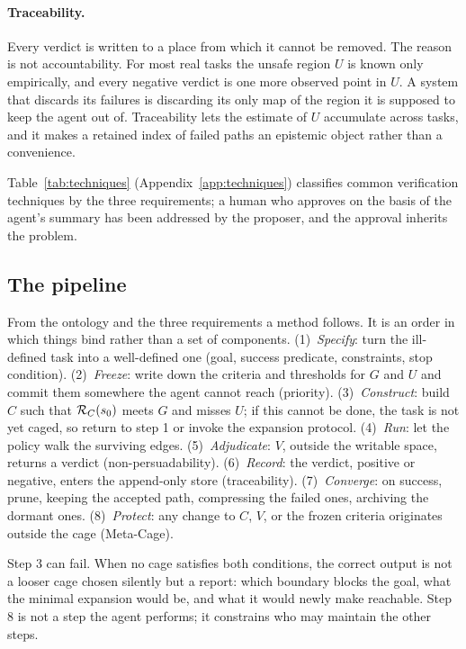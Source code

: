 \paragraph{Traceability.}
Every verdict is written to a place from which it cannot be removed. The reason is not accountability. For most real tasks the unsafe region $U$ is known only empirically, and every negative verdict is one more observed point in $U$. A system that discards its failures is discarding its only map of the region it is supposed to keep the agent out of. Traceability lets the estimate of $U$ accumulate across tasks, and it makes a retained index of failed paths an epistemic object rather than a convenience.

Table~\ref{tab:techniques} (Appendix~\ref{app:techniques}) classifies common verification techniques by the three requirements; a human who approves on the basis of the agent's summary has been addressed by the proposer, and the approval inherits the problem.


\subsection{The pipeline}
\label{sec:pipeline}

From the ontology and the three requirements a method follows. It is an order in which things bind rather than a set of components. (1)~\emph{Specify}: turn the ill-defined task into a well-defined one (goal, success predicate, constraints, stop condition). (2)~\emph{Freeze}: write down the criteria and thresholds for $G$ and $U$ and commit them somewhere the agent cannot reach (priority). (3)~\emph{Construct}: build $C$ such that $\mathcal{R}_{C}(s_0)$ meets $G$ and misses $U$; if this cannot be done, the task is not yet caged, so return to step 1 or invoke the expansion protocol. (4)~\emph{Run}: let the policy walk the surviving edges. (5)~\emph{Adjudicate}: $V$, outside the writable space, returns a verdict (non-persuadability). (6)~\emph{Record}: the verdict, positive or negative, enters the append-only store (traceability). (7)~\emph{Converge}: on success, prune, keeping the accepted path, compressing the failed ones, archiving the dormant ones. (8)~\emph{Protect}: any change to $C$, $V$, or the frozen criteria originates outside the cage (Meta-Cage).

Step 3 can fail. When no cage satisfies both conditions, the correct output is not a looser cage chosen silently but a report: which boundary blocks the goal, what the minimal expansion would be, and what it would newly make reachable. Step 8 is not a step the agent performs; it constrains who may maintain the other steps.

